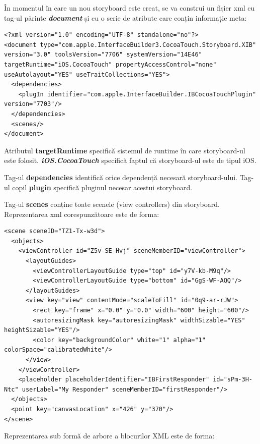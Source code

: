 În momentul în care un nou storyboard este creat, se va construi un fișier xml cu tag-ul părinte \textbf{\textit{document}} și cu o serie de atribute care conțin informație meta:


\lstset{language=XML}
\begin{lstlisting}
<?xml version="1.0" encoding="UTF-8" standalone="no"?>
<document type="com.apple.InterfaceBuilder3.CocoaTouch.Storyboard.XIB" version="3.0" toolsVersion="7706" systemVersion="14E46" targetRuntime="iOS.CocoaTouch" propertyAccessControl="none" useAutolayout="YES" useTraitCollections="YES">
  <dependencies>
    <plugIn identifier="com.apple.InterfaceBuilder.IBCocoaTouchPlugin" version="7703"/>
  </dependencies>
  <scenes/>
</document>
\end{lstlisting}

Atributul \textbf{targetRuntime}  specifică sistemul de runtime în care storyboard-ul este folosit. \textbf{\textit{iOS.CocoaTouch}} specifică faptul că storyboard-ul este de tipul iOS.

Tag-ul \textbf{dependencies} identifică orice dependență necesară storyboard-ului. Tag-ul copil \textbf{plugin} specifică pluginul necesar acestui storyboard.

Tag-ul \textbf{scenes} conține toate scenele (view controllers) din storyboard. Reprezentarea xml corespunzătoare este de forma: 

\lstset{language=XML}
\begin{lstlisting}
<scene sceneID="TZ1-Tx-w3d">
  <objects>
    <viewController id="Z5v-SE-Hvj" sceneMemberID="viewController">
      <layoutGuides>
        <viewControllerLayoutGuide type="top" id="y7V-kb-M9q"/>
        <viewControllerLayoutGuide type="bottom" id="GgS-WF-AQQ"/>
      </layoutGuides>
      <view key="view" contentMode="scaleToFill" id="0q9-ar-rJW">
        <rect key="frame" x="0.0" y="0.0" width="600" height="600"/>
        <autoresizingMask key="autoresizingMask" widthSizable="YES" heightSizable="YES"/>
        <color key="backgroundColor" white="1" alpha="1" colorSpace="calibratedWhite"/>
      </view>
    </viewController>
    <placeholder placeholderIdentifier="IBFirstResponder" id="sPm-3H-Ntc" userLabel="My Responder" sceneMemberID="firstResponder"/>
  </objects>
  <point key="canvasLocation" x="426" y="370"/>
</scene>
\end{lstlisting}

Reprezentarea sub formă de arbore a blocurilor XML este de forma:


